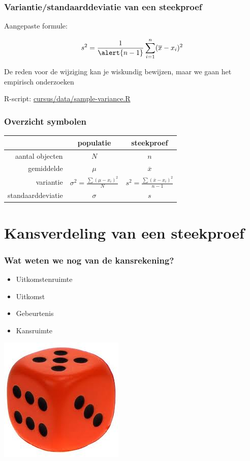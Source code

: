 \documentclass{beamer}
\begin{document}
\begin{frame}
  \frametitle{Variantie/standaarddeviatie van een steekproef}

  \begin{center}
    Aangepaste formule:
    
    \begin{equation*}
    s^2 = \frac{1}{\alert{n-1}} \sum_{i=1}^{n} (\overline{x} - x_i)^2
    \end{equation*}
    
    De reden voor de wijziging kan je wiskundig bewijzen, maar we gaan het empirisch onderzoeken

    \vfill

    R-script: \href{https://github.com/HoGentTIN/onderzoekstechnieken-cursus/blob/master/cursus/data/sample-variance.R}{cursus/data/sample-variance.R}
  \end{center}
\end{frame}

\begin{frame}
\frametitle{Overzicht symbolen}

{\tabulinesep=1.2mm
\begin{tabu}{|r|c|c|}
    \hline
    & populatie & steekproef \\
    \hline
    aantal objecten & $N$ & $n$ \\
    \hline
    gemiddelde & $\mu$ & $\overline{x}$ \\
    \hline
    variantie & $\sigma^2 = \frac{\sum (\mu-x_i)^2}{N}$ & $s^2  = \frac{\sum (\overline{x}-x_i)^2}{n-1}$ \\
    \hline
    standaarddeviatie & $\sigma$ & $s$ \\
    \hline
\end{tabu}}
\end{frame}


\section{Kansverdeling van een steekproef}

\begin{frame}
  \frametitle{Wat weten we nog van de kansrekening?}

  \begin{itemize}
    \item Uitkomstenruimte
    \item Uitkomst
    \item Gebeurtenis
    \item Kansruimte
  \end{itemize}

  \vfill

  \hfill \includegraphics[width=.2\textwidth]{img/les04-dobbelsteen}
\end{frame}
\end{document}
